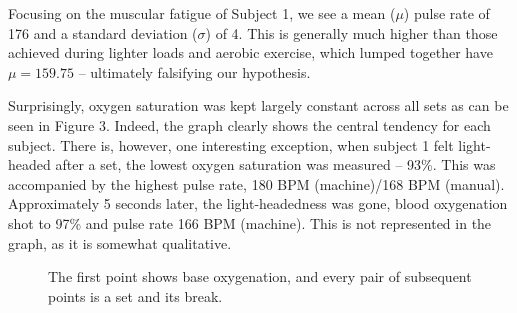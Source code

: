 Focusing on the muscular fatigue of Subject 1, we see a mean ($\mu$) pulse rate of 176 and a standard deviation ($\sigma$) of 4.
This is generally much higher than those achieved during lighter loads and aerobic exercise, which lumped together have $\mu = 159.75$ -- ultimately falsifying our hypothesis. 

Surprisingly, oxygen saturation was kept largely constant across all sets as can be seen in Figure 3. Indeed, the graph clearly shows the central tendency for each subject.
There is, however, one interesting exception, when subject 1 felt light-headed after a set, the lowest oxygen saturation was measured – 93\%.
This was accompanied by the highest pulse rate, 180 BPM (machine)/168 BPM (manual).
Approximately 5 seconds later, the light-headedness was gone, blood oxygenation shot to 97\% and pulse rate 166 BPM (machine).
This is not represented in the graph, as it is somewhat qualitative.
\begin{figure}[h]
    \centering
    \caption{The first point shows base oxygenation, and every pair of subsequent points is a set and its break.}
    \label{fig:BloodOxygenation}
\end{figure}